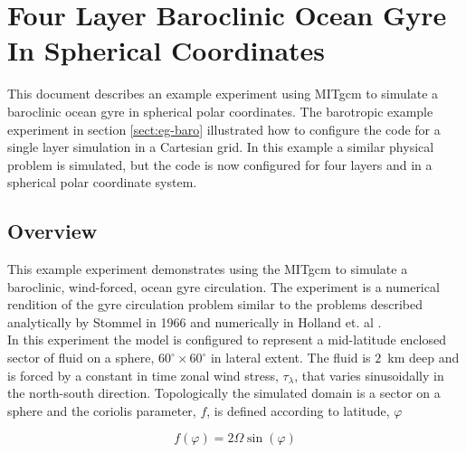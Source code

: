
\section{Four Layer Baroclinic Ocean Gyre In Spherical Coordinates}
\label{www:tutorials}
\label{sect:eg-fourlayer}


%
%

This document describes an example experiment using MITgcm
to simulate a baroclinic ocean gyre in spherical
polar coordinates. The barotropic
example experiment in section \ref{sect:eg-baro}
illustrated how to configure the code for a single layer 
simulation in a Cartesian grid. In this example a similar physical problem
is simulated, but the code is now configured
for four layers and in a spherical polar coordinate system.

\subsection{Overview}
\label{www:tutorials}

This example experiment demonstrates using the MITgcm to simulate
a baroclinic, wind-forced, ocean gyre circulation. The experiment 
is a numerical rendition of the gyre circulation problem similar
to the problems described analytically by Stommel in 1966 
\cite{Stommel66} and numerically in Holland et. al \cite{Holland75}.
\\

In this experiment the model is configured to represent a mid-latitude 
enclosed sector of fluid on a sphere, $60^{\circ} \times 60^{\circ}$ in 
lateral extent. The fluid is $2$~km deep and is forced
by a constant in time zonal wind stress, $\tau_{\lambda}$, that varies 
sinusoidally in the north-south direction. Topologically the simulated 
domain is a sector on a sphere and the coriolis parameter, $f$, is defined 
according to latitude, $\varphi$

\begin{equation}
\label{EQ:eg-fourlayer-fcori}
f(\varphi) = 2 \Omega \sin( \varphi )
\end{equation}
 
